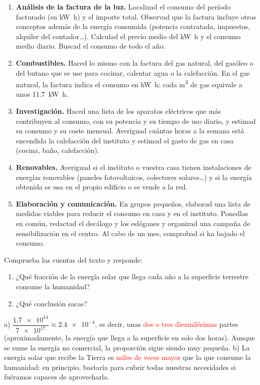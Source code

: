 \begin{enumerate}[label=\numberballred]
    \item \textbf{Análisis de la factura de la luz.} Localizad el consumo del período facturado (en \unit{\kilo\watt\hour}) y el importe total. Observad que la factura incluye otros conceptos además de la energía consumida (potencia contratada, impuestos, alquiler del contador\ldots). Calculad el precio medio del \unit{\kilo\watt\hour} y el consumo medio diario. Buscad el consumo de todo el año.
    \item \textbf{Combustibles.} Haced lo mismo con la factura del gas natural, del gasóleo o del butano que se use para cocinar, calentar agua o la calefacción. En el gas natural, la factura indica el consumo en \unit{\kilo\watt\hour}: cada \unit{\cubic\m} de gas equivale a unos \qty{11.7}{\kilo\watt\hour}.
    \item \textbf{Investigación.} Haced una lista de los aparatos eléctricos que más contribuyen al consumo, con su potencia y su tiempo de uso diario, y estimad su consumo y su coste mensual. Averiguad cuántas horas a la semana está encendida la calefacción del instituto y estimad el gasto de gas en casa (cocina, baño, calefacción).
    \item \textbf{Renovables.} Averiguad si el instituto o vuestra casa tienen instalaciones de energías renovables (paneles fotovoltaicos, colectores solares\ldots) y si la energía obtenida se usa en el propio edificio o se vende a la red.
    \item \textbf{Elaboración y comunicación.} En grupos pequeños, elaborad una lista de medidas viables para reducir el consumo en casa y en el instituto. Ponedlas en común, redactad el decálogo y los eslóganes y organizad una campaña de sensibilización en el centro. Al cabo de un mes, comprobad si ha bajado el consumo.
\end{enumerate}

\begin{exercise}
    Comprueba las cuentas del texto y responde:
    \begin{enumerate}[label=\alph*)]
        \item ¿Qué fracción de la energía solar que llega cada año a la superficie terrestre consume la humanidad?
        \item ¿Qué conclusión sacas?
    \end{enumerate}
    \begin{solu}
        a) \(\dfrac{\num{1.7e14}}{\num{7e17}} \approx \num{2.4e-4}\), es decir, unas \textcolor{red}{dos o tres diezmilésimas} partes (aproximadamente, la energía que llega a la superficie en solo dos horas). Aunque se sume la energía no comercial, la proporción sigue siendo muy pequeña.
        b) La energía solar que recibe la Tierra es \textcolor{red}{miles de veces mayor} que la que consume la humanidad: en principio, bastaría para cubrir todas nuestras necesidades si fuéramos capaces de aprovecharla.
    \end{solu}
\end{exercise}

